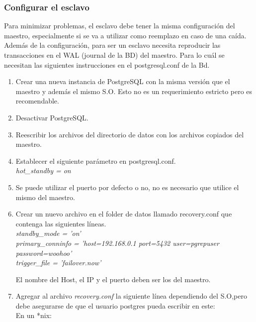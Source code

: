 \subsubsection{Configurar el esclavo}

Para minimizar problemas, el esclavo debe tener la misma configuración del maestro, especialmente si se va a utilizar como reemplazo en caso de una caída. Además de la configuración, para ser un esclavo necesita reproducir las transacciones en el WAL (journal de la BD) del maestro. Para lo cuál se necesitan las siguientes instrucciones en el postgresql.conf de la Bd.

\begin{enumerate}
\item Crear una nueva instancia de PostgreSQL con la misma versión que el maestro y además el mismo S.O. Esto no es un requerimiento estricto pero es recomendable.
\item Desactivar PostgreSQL.
\item Reescribir los archivos del directorio de datos con los archivos copiados del maestro.
\item Establecer el siguiente parámetro en postgresql.conf.\\

\textit{hot\_standby = on}\\

\item Se puede utilizar el puerto por defecto o no, no es necesario que utilice el mismo del maestro.
\item Crear un nuevo archivo en el folder de datos llamado recovery.conf que contenga las siguientes líneas.\\

\textit{standby\_mode = 'on'\\
primary\_conninfo = 'host=192.168.0.1 port=5432 user=pgrepuser password=woohoo'\\
trigger\_file = 'failover.now'\\}

El  nombre del Host, el IP y el puerto deben ser los del maestro.\\

\item Agregar al archivo \textit{recovery.conf} la siguiente línea dependiendo del S.O,pero debe asegurarse de que el usuario postgres pueda escribir en este:\\
 
En un *nix:\\


\end{enumerate}
